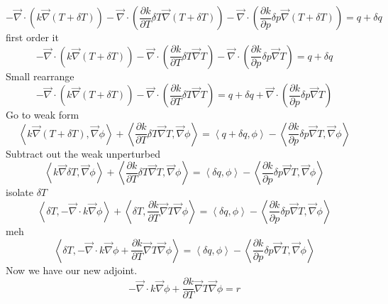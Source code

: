 \documentclass{article}
\newcommand{\bra}{\left\langle}
\newcommand{\ket}{\right\rangle}
\renewcommand{\div}{\vec{\nabla} \cdot}
\newcommand{\grad}{\vec{\nabla}}
\begin{document}
\begin{equation}
- \div ( k \grad (T + \delta T) ) - \div ( \frac{\partial k}{\partial T} \delta T \grad (T + \delta T) ) - \div ( \frac{\partial k}{\partial p} \delta p \grad (T + \delta T) ) = q + \delta q 
\end{equation}
first order it
\begin{equation}
- \div ( k \grad (T + \delta T) ) - \div ( \frac{\partial k}{\partial T} \delta T \grad T  ) - \div ( \frac{\partial k}{\partial p} \delta p \grad T ) = q + \delta q 
\end{equation}
Small rearrange
\begin{equation}
- \div ( k \grad (T + \delta T) ) - \div ( \frac{\partial k}{\partial T} \delta T \grad T  )  = q + \delta q + \div ( \frac{\partial k}{\partial p} \delta p \grad T )
\end{equation}
Go to weak form
\begin{equation}
\bra k \grad (T + \delta T) , \grad \phi \ket + \bra \frac{\partial k}{\partial T} \delta T \grad T  , \grad \phi \ket  = \bra q + \delta q , \phi \ket - \bra \frac{\partial k}{\partial p} \delta p \grad T , \grad \phi \ket
\end{equation}
Subtract out the weak unperturbed
\begin{equation}
\bra k \grad \delta T , \grad \phi \ket + \bra \frac{\partial k}{\partial T} \delta T \grad T  , \grad \phi \ket  = \bra  \delta q , \phi \ket - \bra \frac{\partial k}{\partial p} \delta p \grad T , \grad \phi \ket
\end{equation}
isolate $\delta T$
\begin{equation}
\bra \delta T , - \div k \grad \phi \ket + \bra  \delta T , \frac{ \partial k}{\partial T} \grad T  \grad \phi \ket  = \bra  \delta q , \phi \ket - \bra \frac{\partial k}{\partial p} \delta p \grad T , \grad \phi \ket
\end{equation}
meh
\begin{equation}
\bra \delta T , - \div k \grad \phi + \frac{ \partial k}{\partial T} \grad T  \grad \phi \ket  = \bra  \delta q , \phi \ket - \bra \frac{\partial k}{\partial p} \delta p \grad T , \grad \phi \ket
\end{equation}
Now we have our new adjoint.
\begin{equation}
 - \div k \grad \phi + \frac{ \partial k}{\partial T} \grad T  \grad \phi = r
\end{equation}
\end{document}
